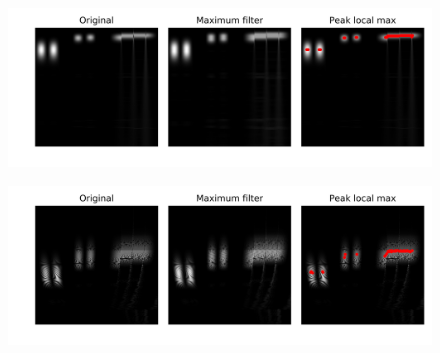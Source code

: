 \begin{figure}[!ht]
	\centering
	\includegraphics[width=\linewidth]{papers/autotune/sections/frames/images/cwtmaxima.jpg}
	\label{fig:cwt:max}
\end{figure}%

\begin{figure}[!ht]
	\centering
	\includegraphics[width=\linewidth]{papers/autotune/sections/frames/images/dwtmaxima.jpg}
	\label{fig:cwt:max}
\end{figure}%


